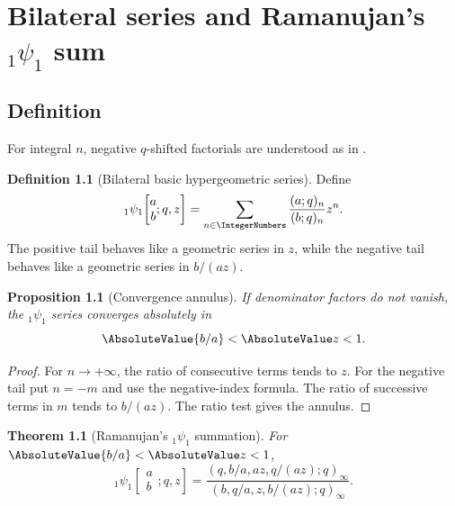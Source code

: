 \documentclass[11pt,a4paper,oneside,openany]{book}
\newtheorem{theorem}{Theorem}[chapter]
\newtheorem{proposition}[proposition]{Proposition}
\theoremstyle{definition}
\newtheorem{definition}[definition]{Definition}
\theoremstyle{remark}
\begin{document}


\chapter{Bilateral series and Ramanujan's \texorpdfstring{${}_1\psi_1$}{1psi1} sum}\label{chap:bilateral}

\section{Definition}

For integral $n$, negative $q$-shifted factorials are understood as in
.
\begin{definition}[Bilateral basic hypergeometric series]
\label{qg:def-bilateral-basic-hypergeometric}
Define
\[
 {}_1\psi_1\!\left[\begin{matrix}a\\b\end{matrix};q,z\right]
 =\sum_{n\in\IntegerNumbers}\frac{(a;q)_n}{(b;q)_n}z^n.
\]
The positive tail behaves like a geometric series in $z$, while the negative tail behaves like a geometric series in $b/(az)$.
\end{definition}

\begin{proposition}[Convergence annulus]\label{prop:1psi1-convergence}
If denominator factors do not vanish, the ${}_1\psi_1$ series converges absolutely in
\[
 \AbsoluteValue{b/a}<\AbsoluteValue z<1.
\]
\end{proposition}

\begin{proof}
For $n\to+\infty$, the ratio of consecutive terms tends to $z$.  For the negative tail put $n=-m$ and use the negative-index formula.  The ratio of successive terms in $m$ tends to $b/(az)$.  The ratio test gives the annulus.
\end{proof}

\begin{theorem}[Ramanujan's ${}_1\psi_1$ summation]\label{thm:1psi1}
For $\AbsoluteValue{b/a}<\AbsoluteValue z<1$,
\[
 {}_1\psi_1\!\left[\begin{matrix}a\\b\end{matrix};q,z\right]
 =\frac{(q,b/a,az,q/(az);q)_\infty}
 {(b,q/a,z,b/(az);q)_\infty}.
\]
\end{theorem}
\end{document}
